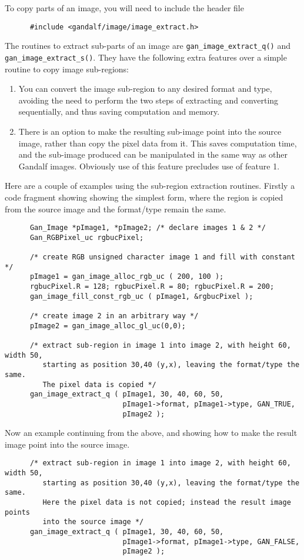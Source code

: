 To copy parts of an image, you will need to include the header file
\begin{verbatim}
      #include <gandalf/image/image_extract.h>
\end{verbatim}
The routines to extract sub-parts of an image are
{\tt gan\_image\_extract\_q()} and {\tt gan\_image\_extract\_s()}.
They have the following extra features over a simple routine to
copy image sub-regions:
\begin{enumerate}
  \item You can convert the image sub-region to any desired format and type,
        avoiding the need to perform the two steps of extracting and
        converting sequentially, and thus saving computation and memory.
  \item There is an option to make the resulting sub-image point into the
        source image, rather than copy the pixel data from it.
        This saves computation time, and the sub-image produced can be
        manipulated in the same way as other Gandalf images.
        Obviously use of this feature precludes use of feature 1.
\end{enumerate}
Here are a couple of examples using the sub-region extraction routines.
Firstly a code fragment showing showing the simplest form, where the
region is copied from the source image and the format/type remain the same.
\begin{verbatim}
      Gan_Image *pImage1, *pImage2; /* declare images 1 & 2 */
      Gan_RGBPixel_uc rgbucPixel;

      /* create RGB unsigned character image 1 and fill with constant */
      pImage1 = gan_image_alloc_rgb_uc ( 200, 100 );
      rgbucPixel.R = 128; rgbucPixel.R = 80; rgbucPixel.R = 200;
      gan_image_fill_const_rgb_uc ( pImage1, &rgbucPixel );

      /* create image 2 in an arbitrary way */
      pImage2 = gan_image_alloc_gl_uc(0,0);

      /* extract sub-region in image 1 into image 2, with height 60, width 50,
         starting as position 30,40 (y,x), leaving the format/type the same.
         The pixel data is copied */
      gan_image_extract_q ( pImage1, 30, 40, 60, 50,
                            pImage1->format, pImage1->type, GAN_TRUE,
                            pImage2 );
\end{verbatim}
Now an example continuing from the above, and showing how to make the result
image point into the source image.
\begin{verbatim}
      /* extract sub-region in image 1 into image 2, with height 60, width 50,
         starting as position 30,40 (y,x), leaving the format/type the same.
         Here the pixel data is not copied; instead the result image points
         into the source image */
      gan_image_extract_q ( pImage1, 30, 40, 60, 50,
                            pImage1->format, pImage1->type, GAN_FALSE,
                            pImage2 );
\end{verbatim}
